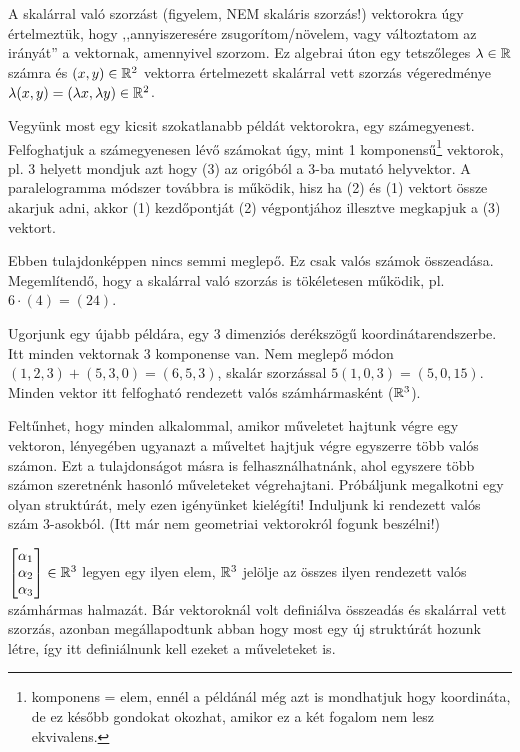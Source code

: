 \documentclass[a4paper,11.5pt]{article}
\begin{document}
	A skalárral való szorzást (figyelem, NEM skaláris szorzás!) vektorokra úgy értelmeztük, hogy ,,annyiszeresére zsugorítom/növelem, vagy változtatom az irányát'' a vektornak, amennyivel szorzom. Ez algebrai úton egy tetszőleges $\lambda \in \mathbb{R}$ számra és $(x,y)\in\mathbb{R}^2$ vektorra értelmezett skalárral vett szorzás végeredménye $\lambda(x, y)= (\lambda x, \lambda y) \in \mathbb{R}^2$.
	
	Vegyünk most egy kicsit szokatlanabb példát vektorokra, egy számegyenest. Felfoghatjuk a számegyenesen lévő számokat úgy, mint 1 komponensű\footnote{komponens = elem, ennél a példánál még azt is mondhatjuk hogy koordináta, de ez később gondokat okozhat, amikor ez a két fogalom nem lesz ekvivalens.} vektorok, pl. 3 helyett mondjuk azt hogy (3) az origóból a 3-ba mutató helyvektor. A paralelogramma módszer továbbra is működik, hisz ha (2) és (1) vektort össze akarjuk adni, akkor (1) kezdőpontját (2) végpontjához illesztve megkapjuk a (3) vektort. 
	
	Ebben tulajdonképpen nincs semmi meglepő. Ez csak valós számok összeadása. Megemlítendő, hogy a skalárral való szorzás is tökéletesen működik, pl. $6\cdot(4)=(24)$.
	
	Ugorjunk egy újabb példára, egy 3 dimenziós derékszögű koordinátarendszerbe. Itt minden vektornak 3 komponense van. Nem meglepő módon $(1,2,3)+(5,3,0)=(6,5,3)$, skalár szorzással $5(1,0,3)=(5,0,15)$. Minden vektor itt felfogható rendezett valós számhármasként ($\mathbb{R}^3$).
	
	\medskip
	Feltűnhet, hogy minden alkalommal, amikor műveletet hajtunk végre egy vektoron, lényegében ugyanazt a műveltet hajtjuk végre egyszerre több valós számon. Ezt a tulajdonságot másra is felhasználhatnánk, ahol egyszere több számon szeretnénk hasonló műveleteket végrehajtani. Próbáljunk megalkotni egy olyan struktúrát, mely ezen igényünket kielégíti! Induljunk ki rendezett valós szám 3-asokból. (Itt már nem geometriai vektorokról fogunk beszélni!)
	
	$\begin{bmatrix}
		\alpha_1 \s\\
		\alpha_2\s \\
		\alpha_3\s \\
	\end{bmatrix} \in \R^3$ legyen egy ilyen elem, $\mathbb{R}^3$ jelölje az összes ilyen rendezett valós számhármas halmazát. Bár vektoroknál volt definiálva összeadás és skalárral vett szorzás, azonban megállapodtunk abban hogy most egy új struktúrát hozunk létre, így itt definiálnunk kell ezeket a műveleteket is.
	
\end{document}
